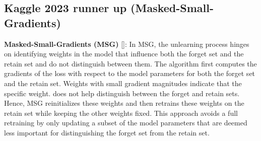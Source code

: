 \documentclass{article}
\begin{document}
\subsection{Kaggle 2023 runner up (Masked-Small-Gradients)}
\textbf{Masked-Small-Gradients (MSG)} [\cite{2023-second-place}]: In MSG, the unlearning process hinges on identifying weights in the model that influence both the forget set and the retain set and do not distinguish between them. The algorithm first computes the gradients of the loss with respect to the model parameters for both the forget set and the retain set. Weights with small gradient magnitudes indicate that the specific weight. 
does not help distinguish between the forget and retain sets. Hence, MSG reinitializes these weights and then retrains these weights on the retain set while keeping the other weights fixed. This approach avoids a full retraining by only updating a subset of the model parameters that are deemed less important for distinguishing the forget set from the retain set.
\end{document}
